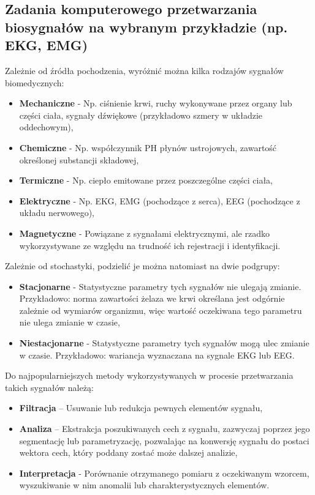 \subsection{Zadania komputerowego przetwarzania biosygnałów na wybranym przykładzie (np. EKG, EMG)}

Zależnie od źródła pochodzenia, wyróżnić można kilka rodzajów sygnałów biomedycznych:

\begin{itemize}
	\item \textbf{Mechaniczne} - Np. ciśnienie krwi, ruchy wykonywane przez organy lub części ciała, sygnały dźwiękowe (przykładowo szmery w układzie oddechowym),
	\item \textbf{Chemiczne} - Np. współczynnik PH płynów ustrojowych, zawartość określonej substancji składowej,
	\item \textbf{Termiczne} - Np. ciepło emitowane przez poszczególne części ciała,
	\item \textbf{Elektryczne} - Np. EKG, EMG (pochodzące z serca), EEG (pochodzące z układu nerwowego),
	\item \textbf{Magnetyczne} - Powiązane z sygnałami elektrycznymi, ale rzadko wykorzystywane ze względu na trudność ich rejestracji i identyfikacji.
\end{itemize}

Zależnie od stochastyki, podzielić je można natomiast na dwie podgrupy:

\begin{itemize}
	\item \textbf{Stacjonarne} - Statystyczne parametry tych sygnałów nie ulegają zmianie. Przykładowo: norma zawartości żelaza we krwi określana jest odgórnie zależnie od wymiarów organizmu, więc wartość oczekiwana tego parametru nie ulega zmianie w czasie,
	\item \textbf{Niestacjonarne} - Statystyczne parametry tych sygnałów mogą ulec zmianie w czasie. Przykładowo: wariancja wyznaczana na sygnale EKG lub EEG.
\end{itemize}

Do najpopularniejszych metody wykorzystywanych w procesie przetwarzania takich sygnałów należą:

\begin{itemize}
	\item \textbf{Filtracja} – Usuwanie lub redukcja pewnych elementów sygnału,
	\item \textbf{Analiza} – Ekstrakcja poszukiwanych cech z sygnału, zazwyczaj poprzez jego segmentację lub parametryzację, pozwalając na konwersję sygnału do postaci wektora cech, który poddany zostać może dalszej analizie,
	\item \textbf{Interpretacja} - Porównanie otrzymanego pomiaru z oczekiwanym wzorcem, wyszukiwanie w nim anomalii lub charakterystycznych elementów.
\end{itemize}

